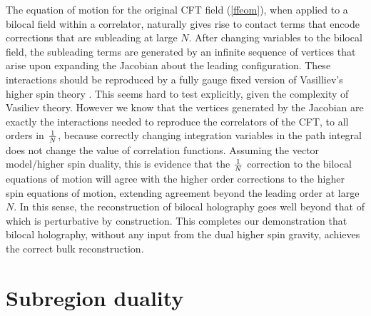 \documentclass[a4paper,12pt]{article}
\begin{document}
The equation of motion for the original CFT field (\ref{ffeom}), when applied to a bilocal field within a correlator, 
naturally gives rise to contact terms that encode corrections that are subleading at large $N$.
After changing variables to the bilocal field, the subleading terms are generated by an infinite sequence of vertices 
that arise upon expanding the Jacobian about the leading configuration.
These interactions should be reproduced by a fully gauge fixed version of Vasilliev's higher spin 
theory \cite{Vasiliev:1990en,Vasiliev:2003ev,Didenko:2014dwa}.
This seems hard to test explicitly, given the complexity of Vasiliev theory.
However we know that the vertices generated by the Jacobian are exactly the interactions needed to reproduce the 
correlators of the CFT, to all orders in ${1\over N}$, because correctly changing integration variables in the path integral 
does not change the value of correlation functions.
Assuming the vector model/higher spin duality, this is evidence that the ${1\over N}$ correction to the bilocal equations of 
motion will agree with the higher order corrections to the higher spin equations of motion, extending agreement beyond 
the leading order at large $N$. 
In this sense, the reconstruction of bilocal holography goes well beyond that of 
\cite{Banks:1998dd,Bena:1999jv,Hamilton:2006az} which is perturbative by construction.
This completes our demonstration that bilocal holography, without any input from the dual higher spin gravity, 
achieves the correct bulk reconstruction.

\section{Subregion duality}\label{subregion}
\end{document}
